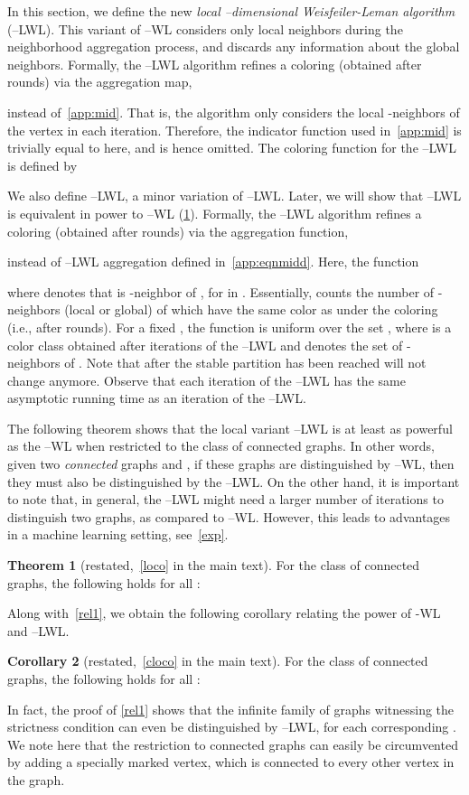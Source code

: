\documentclass{article}
\theoremstyle{definition}
\newtheorem{theorem}{Theorem}
\newtheorem{corollary}[theorem]{Corollary}
\newcommand{\new}[1]{\emph{#1}}
\newcommand{\kwl}{-\textsf{WL}\xspace}
\newcommand{\deltakwl}{--\textsf{WL}\xspace}
\newcommand{\localkwl}{--\textsf{LWL}\xspace}
\newcommand{\pluskwl}{--\textsf{LWL}\xspace}
\begin{document}
In this section, we define the new \new{local --dimensional Weisfeiler-Leman algorithm} (\localkwl). This variant of \deltakwl considers only local neighbors during the neighborhood aggregation process, and discards any information about the global neighbors. Formally, the \localkwl algorithm refines a coloring  (obtained after  rounds) via the aggregation map, 
		
instead of~\cref{app:mid}. That is, the algorithm only considers the local -neighbors of the vertex  in each iteration. 
Therefore, the indicator function  used in~\cref{app:mid} is trivially equal to  here, and is hence omitted. 
The coloring function for the \localkwl is defined by
 
We also define \pluskwl, a minor variation of \localkwl. Later, we will show that \pluskwl is equivalent in power to --WL (\cref{app:loco}). 
Formally, the \pluskwl algorithm refines a coloring  (obtained after  rounds) via the aggregation function, 

instead of \localkwl aggregation defined in~\cref{app:eqnmidd}. 
Here, the function

where  denotes that  is -neighbor of , for  in . Essentially,  counts the number of -neighbors (local or global) of  which have the same color as  under the coloring  (i.e., after  rounds). For a fixed ,
the function  is uniform over the set , where  is a color class obtained after  iterations of the \pluskwl and  denotes the set of -neighbors of . Note that after the stable partition has been reached  will not change anymore. Observe that each iteration of the \pluskwl has the same asymptotic running time as an iteration of the \localkwl.

The following theorem shows that the local variant \pluskwl is at least as powerful as the \deltakwl when restricted to the class of connected graphs. In other words, given two \emph{connected} graphs  and , if these graphs are distinguished by \deltakwl, then they must also be distinguished by the \pluskwl. On the other hand, it is important to note that, in general, the \pluskwl might need a larger number of iterations to distinguish two graphs, as compared to \deltakwl. However, this leads to advantages in a machine learning setting, see~\cref{exp}.
\begin{theorem}[restated,~\cref{loco} in the main text]\label{app:loco}
	For the class of connected graphs, the following holds for all :
	
\end{theorem}	
Along with~\cref{rel1}, we obtain the following corollary relating the power of \kwl and \pluskwl. 
\begin{corollary}[restated,~\cref{cloco} in the main text] For the class of connected graphs, the following holds for all :	
\end{corollary}
In fact, the proof of \cref{rel1} shows that the infinite family of graphs  witnessing the strictness condition can even be distinguished by \localkwl,
for each corresponding . We note here that the restriction to connected graphs can easily be circumvented by adding a specially marked vertex, which is connected to every other vertex in the graph.
\end{document}
